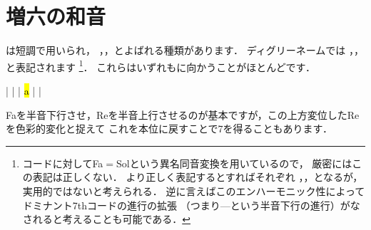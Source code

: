 \documentclass[dvipdfmx,uplatex,b5paper,openany,jbase=12Q,nomag*,textwidth-limit=44%
               ]{gachimuchi}[2020/05/05]
\begin{document}
\section{増六の和音}
は短調で用いられ，
，，とよばれる種類があります．
ディグリーネームでは
\bFlat\Gnvi{}，\bFlat\Gnvi{}，\bFlat\Gnvi{}と表記されます%
\footnote{
  コードに対してFa\aSharp$=$Sol\aFlat という異名同音変換を用いているので，%
  厳密にはこの表記は正しくない．
  より正しく表記するとすればそれぞれ
  \bFlat\Gnvi{}，\bFlat\Gnvi{}，\bFlat\Gnvi{}となるが，
  実用的ではないと考えられる．
  逆に言えばこのエンハーモニック性によってドミナント7thコードの進行の拡張
  （つまり\Gnvi\aFlat{}---\Gnv という半音下行の進行）がなされると考えることも可能である．
}．
これらはいずれも\Gnv に向かうことがほとんどです．
\begin{Music}
  \generalmeter{\meterC}%
  \Startpiece
  \NOTes%
  |%
  \en\doublebar%
  \znotes%
  |%
  \en%
  \NOTes%
  \figbassuu[\Slash{6}]%
  \zchordsl{\Gnv}%
  |%
  \en\doublebar%
  \NOTes%
  \figbassuu[5][\Slash{6}]\hl{a}%
  \zchordsl{\Gnv}%
  |%
  \en\doublebar%
  \NOTes%
  \figbassuu[3][4][\Slash{6}]%
  \zchordsl{\Gnv}%
  |%
  \en\setdoublebar%
  \endpiece%
\end{Music}

Faを半音下行させ，Re\aSharp を半音上行させるのが基本ですが，この上方変位したRe\aSharp を色彩的変化と捉えて
これを本位に戻すことで\Gnv\subsc7を得ることもあります．
\end{document}
